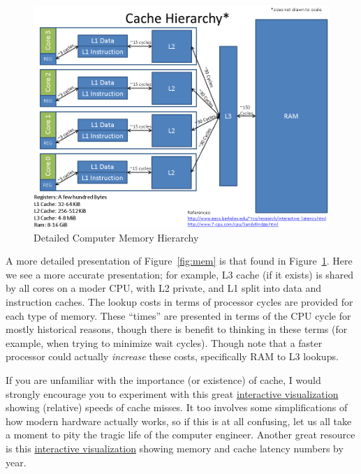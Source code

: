\begin{figure}[ht]
  \centering
  \includegraphics[scale=.54]{./include/pics/cache}
  \caption{Detailed Computer Memory Hierarchy}
  \label{fig:mem2}
\end{figure}
A more detailed presentation of Figure~\ref{fig:mem} is that found in 
Figure~\ref{fig:mem2}.  Here we see a more accurate presentation; for example, 
L3 cache (if it exists) is shared by all cores on a moder CPU, with L2 private, 
and L1 split into data and instruction caches.  The lookup costs in terms of 
processor cycles are provided for each type of memory.  These ``times'' are 
presented in terms of the CPU cycle for mostly historical reasons, though there 
is benefit to thinking in these terms (for example, when trying to minimize 
wait cycles).  Though note that a faster processor could actually 
\emph{increase} these costs, specifically RAM to L3 lookups.

If you are unfamiliar with the importance (or existence) of cache, I would 
strongly encourage you to experiment with this great
\href{http://www.overbyte.com.au/misc/Lesson3/CacheFun.html}%
{interactive visualization} 
showing (relative) speeds of cache misses. It too involves some simplifications 
of how modern hardware actually works, so if this is at all confusing, let us 
all take a moment to pity the tragic life of the computer engineer.  Another 
great resource is this
\href{http://www.eecs.berkeley.edu/~rcs/research/interactive_latency.html}%
{interactive visualization} showing memory and cache latency numbers by year.






